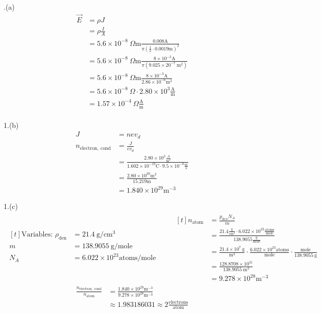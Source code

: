 \documentclass[11pt]{article}
\begin{document}
.(a)
\begin{align*}
\overrightarrow{E} &= \rho J \\
  &= \rho \frac{I}{A} \\
  &= 5.6 \times 10^{-8} \ \Omega \mathrm{m} \frac{0.008 \mathrm{A}}{\pi (\frac{1}{2} \cdot 0.0019 \mathrm{m})^{2}} \\
  &= 5.6 \times 10^{-8} \ \Omega \mathrm{m} \frac{8 \times 10^{-3} \mathrm{A}}{\pi (9.025 \times 20^{-7} \ \mathrm{m}^{2})} \\
  &= 5.6 \times 10^{-8} \ \Omega \mathrm{m} \frac{8 \times 10^{-3} \mathrm{A}}{2.86 \times 10^{-6} \mathrm{m}^{2}} \\
  &= 5.6 \times 10^{-8} \ \Omega \cdot 2.80 \times 10^{3} \frac{\mathrm{A}}{\mathrm{m}} \\
  &= 1.57 \times 10^{-4} \ \Omega \frac{\mathrm{A}}{\mathrm{m}} \\
\end{align*}

1.(b)
\begin{align*}
J &= ne v_d \\
n_{\mathrm{electron,\  cond}} &= \frac{J}{e v_d} \\
  &= \frac{2.80 \times 10^3 \frac{A}{\mathrm{m}^2}}{1.602 \times 10^{-19} \mathrm{C} \cdot 9.5 \times 10^{-8} \frac{\mathrm{m}}{\mathrm{s}}} \\
  &= \frac{2.80 \times 10^{30} \mathrm{m}^2}{15.219 \mathrm{m}} \\
  &= 1.840 \times 10^{29} \mathrm{m}^{-3}
\end{align*}

1.(c)
\begin{align*}
\begin{aligned}[t]
\text{Variables: }
\rho_{\mathrm{den}} &= 21.4 \ \mathrm{g}/\mathrm{cm}^{3} \\
m &= 138.9055 \ \mathrm{g} / \mathrm{mole} \\
N_A &= 6.022 \times 10^{23} \mathrm{atoms}/\mathrm{mole} \\
\end{aligned}
\qquad
\begin{aligned}[t]
n_{\mathrm{atom}} &= \frac{p_{den} N_A}{m} \\
  &= \frac{21.4 \tfrac{\mathrm{g}}{\mathrm{cm}^{3}} \cdot 6.022 \times 10^{23} \frac{\mathrm{atoms}}{\mathrm{mole}}}{138.9055 \tfrac{\mathrm{g}}{\mathrm{mole}}} \\
  &= \frac{21.4 \times 10^{7} \ \mathrm{g}}{\mathrm{m}^{3}} \cdot \frac{6.022 \times 10^{23} \mathrm{atoms}}{\mathrm{mole}} \cdot \frac{\mathrm{mole}}{138.9055 \ \mathrm{g}} \\
  &= \frac{128.8708 \times 10^{31}}{138.9055 \ \mathrm{m}^{3}} \\
  &= 9.278 \times 10^{28} \mathrm{m}^{-3}
\end{aligned}
\end{align*}
\begin{align*}
\frac{n_{\mathrm{electron, \ cond}}}{n_{\mathrm{atom}}} &= \frac{1.840 \times 10^{29} \mathrm{m}^{-3}}{9.278 \times 10^{28} \mathrm{m}^{-3}} \\
  &\approx 1.983186031 \approx 2 \frac{\mathrm{electrons}}{\mathrm{atom}}
\end{align*}
\end{document}

